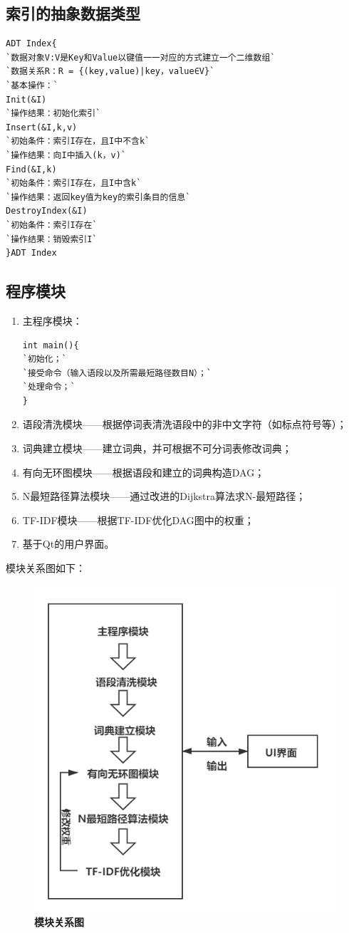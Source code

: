 \documentclass[UTF8]{ctexart}
\begin{document}
\subsection{索引的抽象数据类型}
\begin{lstlisting}
ADT Index{
`数据对象V:V是Key和Value以键值一一对应的方式建立一个二维数组`
`数据关系R：R = {(key,value)|key，value∈V}`
`基本操作：`
Init(&I)
`操作结果：初始化索引`
Insert(&I,k,v)
`初始条件：索引I存在，且I中不含k`
`操作结果：向I中插入(k，v)`
Find(&I,k)
`初始条件：索引I存在，且I中含k`
`操作结果：返回key值为key的索引条目的信息`
DestroyIndex(&I)
`初始条件：索引I存在`
`操作结果：销毁索引I`
}ADT Index
\end{lstlisting}
\subsection{程序模块}
\begin{enumerate}[1)]
\item 主程序模块：
\begin{lstlisting}
int main(){
`初始化；`
`接受命令（输入语段以及所需最短路径数目N）；`
`处理命令；`
}
\end{lstlisting}
\item 语段清洗模块——根据停词表清洗语段中的非中文字符（如标点符号等）；
\item 词典建立模块——建立词典，并可根据不可分词表修改词典；
\item 有向无环图模块——根据语段和建立的词典构造DAG；
\item N最短路径算法模块——通过改进的Dijkstra算法求N-最短路径；
\item TF-IDF模块——根据TF-IDF优化DAG图中的权重；
\item 基于Qt的用户界面。
\end{enumerate}
模块关系图如下：
\begin{figure}[H]
\centerline{
\includegraphics[scale = .6]{part.png}
}
\caption{\textbf{模块关系图}}
\end{figure}
\newpage
\end{document}
